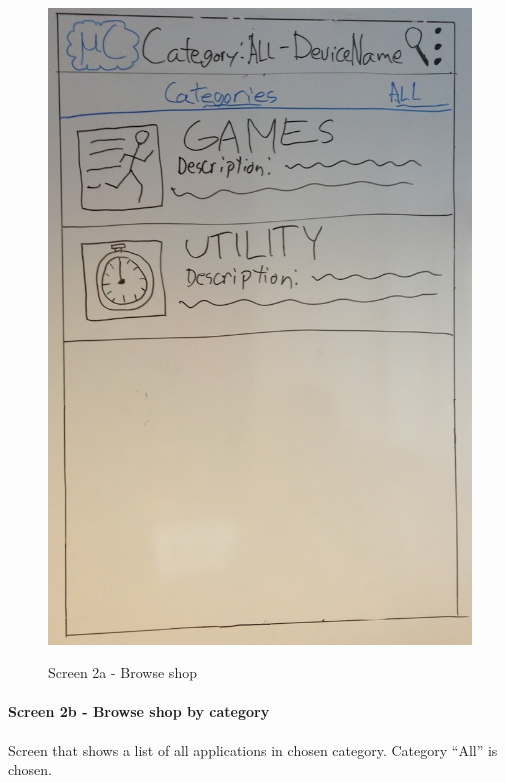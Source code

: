 \begin{figure}[H]
\centering
\includegraphics[scale=0.2]{images/Design_guide/Screen2a.png}
\label{fig:2a}
\caption{Screen 2a - Browse shop}
\end{figure}


\paragraph{Screen 2b - Browse shop by category}
Screen that shows a list of all applications in chosen category. Category ``All'' is chosen.

